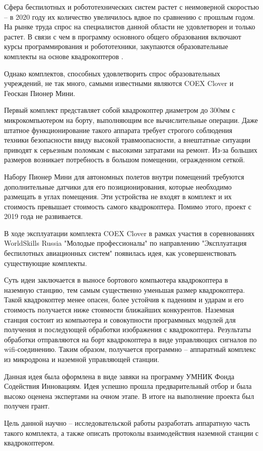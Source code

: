 Сфера беспилотных и робототехнических систем растет с неимоверной скоростью -- в 2020 году их количество увеличилось вдвое по сравнению с прошлым годом. На рынке труда спрос на специалистов данной области не удовлетворен и только растет. В связи с чем в программу основного общего образования включают курсы программирования и робототехники, закупаются образовательные комплекты на основе квадрокоптеров \cite{minobr}.

Однако комплектов, способных удовлетворить спрос образовательных учреждений, не так много, самыми известными являются COEX Clover и Геоскан Пионер Мини.

Первый комплект представляет собой квадрокоптер диаметром до 300мм с микрокомпьютером на борту, выполняющим все вычислительные операции. Даже штатное функционирование такого аппарата требует строгого соблюдения техники безопасности ввиду высокой травмоопасности, а внештатные ситуации приводят к серьезным поломкам с высокими затратами на ремонт. Из-за больших размеров возникает потребность в большом помещении, огражденном сеткой.

Набору Пионер Мини для автономных полетов внутри помещений требуются дополнительные датчики для его позиционирования, которые необходимо размещать в углах помещения. Эти устройства не входят в комплект и их стоимость превышает стоимость самого квадрокоптера. Помимо этого, проект с 2019 года не развивается.

В ходе эксплуатации комплекта COEX Clover в рамках участия в соревнованиях WorldSkills Russia "Молодые профессионалы" по направлению "Эксплуатация беспилотных авиационных систем" появилась идея, как усовершенствовать существующие комплекты.

Суть идеи заключается в выносе бортового компьютера квадрокоптера в наземную станцию, тем самым существенно уменьшая размер квадрокоптера. Такой квадрокоптер менее опасен, более устойчив к падениям и ударам и его стоимость получается ниже стоимости ближайших конкурентов. Наземная станция состоит из компьютера и совокупности программных модулей для получения и последующей обработки изображения с квадрокоптера. Результаты обработки отправляются на борт квадрокоптера в виде управляющих сигналов по wifi-соединению. Таким образом, получается программно -- аппаратный комплекс из микродрона и наземной управляющей станции.

Данная идея была оформлена в виде завяки на программу УМНИК Фонда Содействия Инновациям. Идея успешно прошла предварительный отбор и была высоко оценена экспертами на очном этапе. В итоге на выполнение проекта был получен грант.

Цель данной научно -- исследовательской работы разработать аппаратную часть такого комплекта, а также описать протоколы взаимодействия наземной станции с квадрокоптером.
